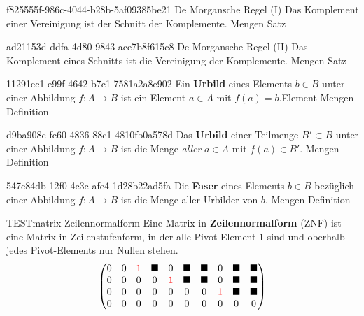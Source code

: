 \documentclass[10pt]{article}
\begin{document}
\begin{note}{f825555f-986c-4044-b28b-5af09385be21}
  \field De Morgansche Regel (I)
  \field
  Das Komplement einer Vereinigung ist der Schnitt der Komplemente.\clend
  \field
  \field Mengen
  \field Satz
\end{note}
 
\begin{note}{ad21153d-ddfa-4d80-9843-ace7b8f615c8}
  \field De Morgansche Regel (II)
  \field
    Das Komplement eines Schnitts ist die Vereinigung der Komplemente.\clend
  \field  
  \field Mengen
  \field Satz
\end{note}
 
\begin{note}{11291ec1-e99f-4642-b7c1-7581a2a8e902}
  \field
  \field
  Ein \textbf{Urbild} eines Elements \(b\in B\) unter einer Abbildung \(f\colon A\to B\) ist ein Element \(a\in A\) mit \(f(a) = b\).\hint Element\clend
  \field
  \field Mengen
  \field Definition
\end{note}
 
 
\begin{note}{d9ba908c-fc60-4836-88c1-4810fb0a578d}
  \field
  \field Das \textbf{Urbild} einer Teilmenge \(B'\subset B\) unter einer Abbildung \(f\colon A\to B\) ist die Menge \emph{aller} \(a\in A\) mit \(f(a) \in B'\).\clend
  \field
  \field Mengen
  \field Definition
\end{note}
 
\begin{note}{547c84db-12f0-4c3c-afe4-1d28b22ad5fa}
  \field
  \field Die \textbf{Faser} eines Elements \(b\in B\) bezüglich einer Abbildung \(f\colon A\to B\) ist die Menge aller Urbilder von \(b\).\clend
  \field
  \field Mengen
  \field Definition
\end{note}

\begin{note}{TESTmatrix}
  \field
  Zeilennormalform
  \field
  Eine Matrix in \textbf{Zeilennormalform} (ZNF) ist  eine Matrix in Zeilenstufenform, in der alle Pivot-Element \(1\) sind und oberhalb jedes Pivot-Elements nur Nullen stehen.\clend
  \field
  \[
    \begin{pmatrix}
      0 & 0 & \textcolor{red}{1} & \blacksquare & 0 & \blacksquare & \blacksquare & 0 & \blacksquare & \blacksquare  \\
      0 & 0 & 0 & 0            & \textcolor{red}{1} & \blacksquare & \blacksquare & 0 & \blacksquare & \blacksquare  \\
      0 & 0 & 0 & 0            & 0 & 0            & 0            & \textcolor{red}{1} & \blacksquare & \blacksquare  \\
      0 & 0 & 0 & 0            & 0 & 0            & 0            & 0 & 0            & 0             
    \end{pmatrix}
  \]
  \field
  \field
  \field
\end{note}
\end{document}
